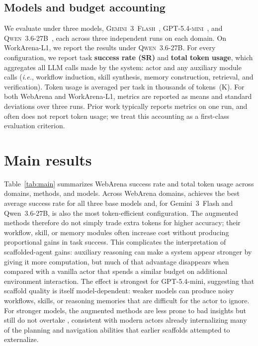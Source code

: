 \subsection{Models and budget accounting}

We evaluate under three models, \textsc{Gemini~3~Flash}~\citep{gemini-team-2025-gemini3}, \textsc{GPT-5.4-mini}~\citep{openai-2026-gpt54mini}, and \textsc{Qwen~3.6-27B}~\citep{qwen-team-2025-qwen36}, each across three independent runs on each domain.
On WorkArena-L1, we report the results under \textsc{Qwen~3.6-27B}.
For every configuration, we report task \textbf{success rate (SR)} and \textbf{total token usage}, which aggregates all LLM calls made by the system: actor and any auxiliary module calls (\textit{i.e.}, workflow induction, skill synthesis, memory construction, retrieval, and verification).
Token usage is averaged per task in thousands of tokens~(K).
For both WebArena and WorkArena-L1, metrics are reported as means and standard deviations over three runs.
Prior work typically reports metrics on one run, and often does not report token usage; we treat this accounting as a first-class evaluation criterion.


\section{Main results}
\label{sec:main}

 Table~\ref{tab:main} summarizes WebArena success rate and total token usage across domains, methods, and models.
Across WebArena domains, \budgetactor{} achieves the best average success rate for all three base models and, for Gemini~3~Flash and Qwen~3.6-27B, is also the most token-efficient configuration.
The augmented methods therefore do not simply trade extra tokens for higher accuracy; their workflow, skill, or memory modules often increase cost without producing proportional gains in task success.
This complicates the interpretation of scaffolded-agent gains: auxiliary reasoning can make a system appear stronger by giving it more computation, but much of that advantage disappears when compared with a vanilla actor that spends a similar budget on additional environment interaction.
The effect is strongest for GPT-5.4-mini, suggesting that scaffold quality is itself model-dependent: weaker models can produce noisy workflows, skills, or reasoning memories that are difficult for the actor to ignore.
For stronger models, the augmented methods are less prone to bad insights but still do not overtake \budgetactor{}, consistent with modern actors already internalizing many of the planning and navigation abilities that earlier scaffolds attempted to externalize.

